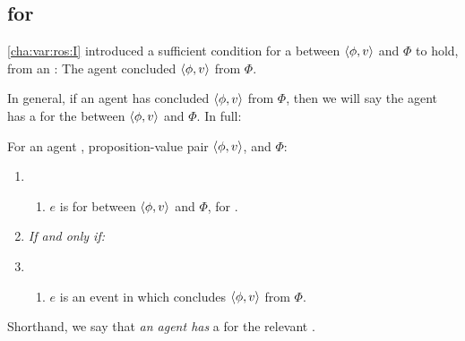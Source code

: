 \subsection{ for }
\label{cha:var:ros:W}

\begin{note}
  \autoref{cha:var:ros:I} introduced a sufficient condition for a \ros{} between \(\langle \phi, v \rangle\) and \(\Phi\) to hold, from an \agpe{}:
  The agent concluded \(\langle \phi, v \rangle\) from \(\Phi\).

  In general, if an agent has concluded \(\langle \phi, v \rangle\) from \(\Phi\), then we will say the agent has a \wit{} for the \ros{} between \(\langle \phi, v \rangle\) and \(\Phi\).
  In full:

  \begin{definition}
    \label{def:witnessing}
    For an agent \vAgent{}, proposition-value pair \(\langle \phi, v \rangle\), and \poP{} \(\Phi\):

    \begin{enumerate}[label=]
    \item
      \begin{enumerate}[label=\alph*., ref=(\alph*), series=WitnessDef]
      \item
        \(e\) is \emph{} for \ros{} between \(\langle \phi, v \rangle\) and \(\Phi\), for \vAgent{}.
      \end{enumerate}
    \item
      \emph{If and only if:}
    \item
      \begin{enumerate}[label=\alph*., ref=(\alph*), resume*=WitnessDef]
      \item
        \(e\) is an event in which \vAgent{} concludes \(\langle \phi, v \rangle\) from \(\Phi\).
      \end{enumerate}
    \end{enumerate}
    \vspace{-\baselineskip}
  \end{definition}

  Shorthand, we say that \emph{an agent has} a  for the relevant \ros{}.
\end{note}

